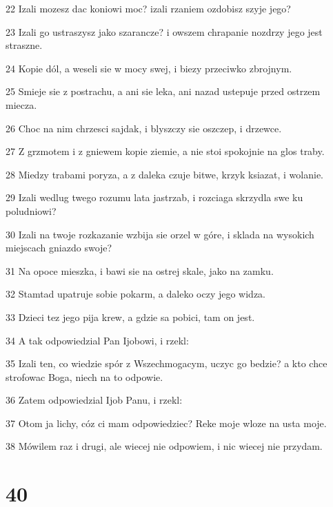 \par 22 Izali mozesz dac koniowi moc? izali rzaniem ozdobisz szyje jego?
\par 23 Izali go ustraszysz jako szarancze? i owszem chrapanie nozdrzy jego jest straszne.
\par 24 Kopie dól, a weseli sie w mocy swej, i biezy przeciwko zbrojnym.
\par 25 Smieje sie z postrachu, a ani sie leka, ani nazad ustepuje przed ostrzem miecza.
\par 26 Choc na nim chrzesci sajdak, i blyszczy sie oszczep, i drzewce.
\par 27 Z grzmotem i z gniewem kopie ziemie, a nie stoi spokojnie na glos traby.
\par 28 Miedzy trabami poryza, a z daleka czuje bitwe, krzyk ksiazat, i wolanie.
\par 29 Izali wedlug twego rozumu lata jastrzab, i rozciaga skrzydla swe ku poludniowi?
\par 30 Izali na twoje rozkazanie wzbija sie orzel w góre, i sklada na wysokich miejscach gniazdo swoje?
\par 31 Na opoce mieszka, i bawi sie na ostrej skale, jako na zamku.
\par 32 Stamtad upatruje sobie pokarm, a daleko oczy jego widza.
\par 33 Dzieci tez jego pija krew, a gdzie sa pobici, tam on jest.
\par 34 A tak odpowiedzial Pan Ijobowi, i rzekl:
\par 35 Izali ten, co wiedzie spór z Wszechmogacym, uczyc go bedzie? a kto chce strofowac Boga, niech na to odpowie.
\par 36 Zatem odpowiedzial Ijob Panu, i rzekl:
\par 37 Otom ja lichy, cóz ci mam odpowiedziec? Reke moje wloze na usta moje.
\par 38 Mówilem raz i drugi, ale wiecej nie odpowiem, i nic wiecej nie przydam.

\chapter{40}

